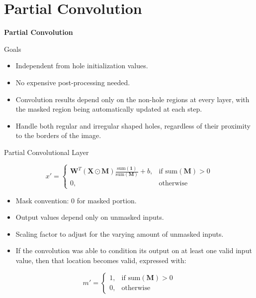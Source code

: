 \documentclass[aspectratio=43]{beamer}
\begin{document}
	
	
	\section{Partial Convolution}
	\begin{frame}
		\begin{center}
			\Huge{\textbf{Partial Convolution}}
		\end{center}
	\end{frame}
	
	
	\begin{frame}{Goals}
		\begin{itemize}
			\item Independent from hole initialization values.
			\item No expensive post-processing needed.
			\item Convolution results depend only on the non-hole regions at every layer, with the masked region being automatically updated at each step.
			\item Handle both regular and irregular shaped holes, regardless of their proximity to the borders of the image.
		\end{itemize}
	\end{frame}
	
	
	\begin{frame}{Partial Convolutional Layer}
		\begin{center}			
			\begin{equation*}
				x' = \begin{cases}
					\mathbf{W}^T(\mathbf{X}\odot\mathbf{M})\frac{\text{sum}(\mathbf{1})}{\text{sum}(\mathbf{M})} + b,  & \text{if }  \text{sum}(\mathbf{M})>0  \\
					0,  & \text{otherwise}
				\end{cases}
			\end{equation*}
			\begin{itemize}
				\item Mask convention: 0 for masked portion.
				\item Output values depend only on unmasked inputs.
				\item Scaling factor to adjust for the varying amount of unmasked inputs.
				\item If the convolution was able to condition its output on at least one valid input value, then that location becomes valid, expressed with:
			\end{itemize}
			\begin{equation*}
					m' = \begin{cases}
					1,  & \text{if }  \text{sum}(\mathbf{M})>0  \\
					0,  & \text{otherwise}
				\end{cases}
			\end{equation*}
		\end{center}
	\end{frame}
	
\end{document}
